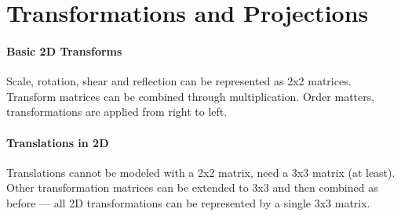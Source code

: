 \documentclass{article}
\begin{document}
\section{Transformations and Projections}

\paragraph{Basic 2D Transforms}

Scale, rotation, shear and reflection can be represented as 2x2 matrices. Transform matrices can be combined through multiplication. Order matters, transformations are applied from right to left.

\paragraph{Translations in 2D} Translations cannot be modeled with a 2x2 matrix, need a 3x3 matrix (at least). Other transformation matrices can be extended to 3x3 and then combined as before --- all 2D transformations can be represented by a single 3x3 matrix.
\end{document}
